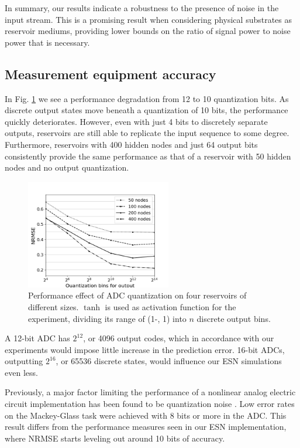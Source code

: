 In summary, our results indicate a robustness to the presence of noise in the
input stream. This is a promising result when considering physical substrates as
reservoir mediums, providing lower bounds on the ratio of signal power to noise
power that is necessary.

\subsection{Measurement equipment accuracy}

In Fig. \ref{adc_quantization} we see a performance degradation from 12 to 10
quantization bits. As discrete output states move beneath a quantization of 10
bits, the performance quickly deteriorates. However, even with just 4 bits to
discretely separate outputs, reservoirs are still able to replicate the input
sequence to some degree. Furthermore, reservoirs with 400 hidden nodes and just
64 output bits consistently provide the same performance as that of a reservoir
with 50 hidden nodes and no output quantization.

\begin{figure}[H]
  \centering
  \includegraphics[width=2.5in]{img/adc_quantization.png}
  \caption{
    Performance effect of ADC quantization on four reservoirs of different
sizes. $\tanh$ is used as activation function for the experiment, dividing its
range of (1-, 1) into $n$ discrete output bins.
  }
  \label{adc_quantization}
\end{figure}

A 12-bit ADC has $2^{12}$, or 4096 output codes, which in accordance with our
experiments would impose little increase in the prediction error. 16-bit ADCs,
outputting $2^{16}$, or 65536 discrete states, would influence our ESN
simulations even less.

Previously, a major factor limiting the performance of a nonlinear analog
electric circuit implementation has been found to be quantization noise
\cite{soriano_delay-based_2015}. Low error rates on the Mackey-Glass task were
achieved with 8 bits or more in the ADC. This result differs from the
performance measures seen in our ESN implementation, where NRMSE starts leveling
out around 10 bits of accuracy.

